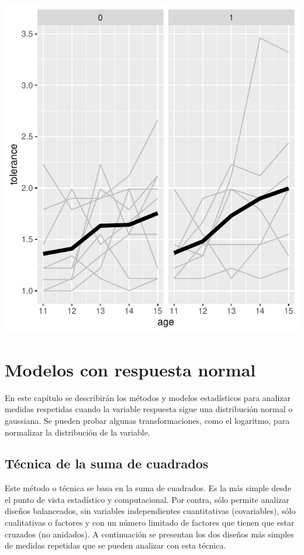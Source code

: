 \documentclass[
]{book}
\begin{document}
\includegraphics{fig_out/unnamed-chunk-43-1.pdf}

\hypertarget{ModelosNormal}{%
\chapter{Modelos con respuesta normal}\label{ModelosNormal}}

En este capítulo se describirán los métodos y modelos estadísticos para analizar medidas respetidas cuando la variable respuesta sigue una distribución normal o gaussiana. Se pueden probar algunas transformaciones, como el logaritmo, para normalizar la distribución de la variable.

\hypertarget{tuxe9cnica-de-la-suma-de-cuadrados}{%
\section{Técnica de la suma de cuadrados}\label{tuxe9cnica-de-la-suma-de-cuadrados}}

Este método o técnica se basa en la suma de cuadrados. Es la más simple desde el punto de vista estadístico y computacional. Por contra, sólo permite analizar diseños balanceados, sin variables independientes cuantitativas (covariables), sólo cualitativas o factores y con un número limitado de factores que tienen que estar cruzados (no anidados). A continuación se presentan los dos diseños más simples de medidas repetidas que se pueden analizar con esta técnica.
\end{document}
